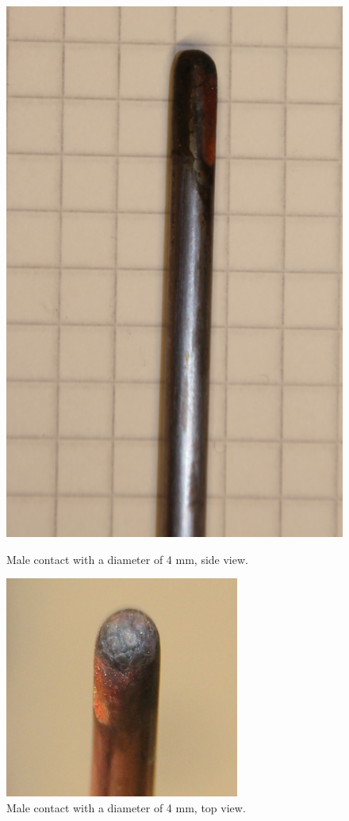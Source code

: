 \documentclass[10pt,a4paper]{article}
\begin{document}
\begin{figure}[H]
\centering
\begin{minipage}{.5\textwidth}
  \centering
  \includegraphics[scale=0.21]{Bilder/Discussion/d4_630and400_burn.png}
  \caption{Male contact with a diameter of 4 mm, \newline side view.}
  \label{fig:d4_burn_side}
\end{minipage}%
\begin{minipage}{.5\textwidth}
  \centering
  \includegraphics[scale=0.54]{Bilder/Discussion/d4_630and400_top_burn.png}
  \caption{Male contact with a diameter of 4 mm, \newline top view.}
  \label{fig:d4_burn_top}
\end{minipage}
\end{figure}
\end{document}
